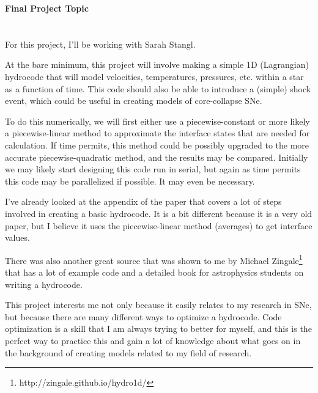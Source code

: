 \documentclass[12pt]{article}
\begin{document}
\begin{center}\begin{LARGE}
\textbf{Final Project Topic}
\end{LARGE}\end{center}


\section*{}

For this project, I'll be working with Sarah Stangl.

\vspace{5mm}

At the bare minimum, this project will involve making a simple 1D (Lagrangian)
hydrocode that will model velocities, temperatures, pressures, etc. within a
star as a function of time. This code should also be able to introduce a
(simple) shock event, which could be useful in creating models of core-collapse
SNe.

To do this numerically, we will first either use a piecewise-constant or more
likely a piecewise-linear method to approximate the interface states that are
needed for calculation. If time permits, this method could be possibly upgraded
to the more accurate piecewise-quadratic method, and the results may be
compared. Initially we may likely start designing this code run in serial, but
again as time permits this code may be parallelized if possible. It may even be
necessary.

I've already looked at the appendix of the \citet{arnett66} paper that covers a
lot of steps involved in creating a basic hydrocode. It is a bit different
because it is a very old paper, but I believe it uses the piecewise-linear
method (averages) to get interface values.

There was also another great source that was shown to me by
Michael Zingale\footnote{http://zingale.github.io/hydro1d/} that has a lot of
example code and a detailed book for astrophysics students on writing a
hydrocode.

\vspace{5mm}

This project interests me not only because it easily relates to my research in
SNe, but because there are many different ways to optimize a hydrocode. Code
optimization is a skill that I am always trying to better for myself, and this
is the perfect way to practice this and gain a lot of knowledge about what
goes on in the background of creating models related to my field of research.



\end{document}
